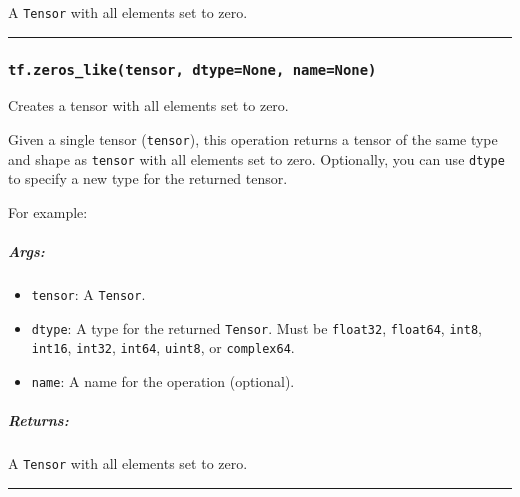 A \texttt{Tensor} with all elements set to zero.

\begin{center}\rule{0.5\linewidth}{\linethickness}\end{center}

\subsubsection{\texorpdfstring{\texttt{tf.zeros\_like(tensor,\ dtype=None,\ name=None)}
}{tf.zeros\_like(tensor, dtype=None, name=None) }}\label{tf.zerosux5fliketensor-dtypenone-namenone}

Creates a tensor with all elements set to zero.

Given a single tensor (\texttt{tensor}), this operation returns a tensor
of the same type and shape as \texttt{tensor} with all elements set to
zero. Optionally, you can use \texttt{dtype} to specify a new type for
the returned tensor.

For example:

\begin{Shaded}
\begin{Highlighting}[]
\OperatorTok{==>} \NormalTok{[[}\NormalTok{, }\NormalTok{, }\NormalTok{], [}\NormalTok{, }\NormalTok{, }\NormalTok{]]}
\end{Highlighting}
\end{Shaded}

\subparagraph{Args: }\label{args-1}

\begin{itemize}
\item
  \texttt{tensor}: A \texttt{Tensor}.
\item
  \texttt{dtype}: A type for the returned \texttt{Tensor}. Must be
  \texttt{float32}, \texttt{float64}, \texttt{int8}, \texttt{int16},
  \texttt{int32}, \texttt{int64}, \texttt{uint8}, or \texttt{complex64}.
\item
  \texttt{name}: A name for the operation (optional).
\end{itemize}

\subparagraph{Returns: }\label{returns-1}

A \texttt{Tensor} with all elements set to zero.

\begin{center}\rule{0.5\linewidth}{\linethickness}\end{center}

